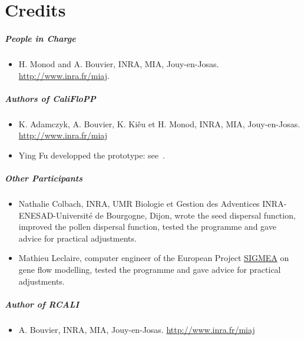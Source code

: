 
\chapter*{Credits}

\paragraph{People in Charge}
\begin{itemize}
\item
H. Monod and A. Bouvier,
INRA, MIA, Jouy-en-Josas.
\href{http://www.inra.fr/miaj}{http://www.inra.fr/miaj}.
\end{itemize}

\paragraph{Authors of CaliFloPP}
\begin{itemize}
\item
K. Adamczyk, A. Bouvier, K. Kiêu et H. Monod,
INRA, MIA, Jouy-en-Josas.
\href{http://www.inra.fr/miaj}{http://www.inra.fr/miaj}

\item
Ying Fu developped the prototype: see~\cite{Ying:2005}.

\end{itemize}

\paragraph{Other Participants}
\begin{itemize}
\item
Nathalie Colbach,
INRA,
UMR Biologie et Gestion des Adventices
INRA-ENESAD-Université de Bourgogne,
Dijon, wrote the seed dispersal function,
improved the pollen dispersal function,
tested the programme
and gave advice for practical adjustments.


\item
Mathieu Leclaire, computer engineer 
of the European Project 
\href{http://sigmea.dyndns.org}{SIGMEA}
on gene flow modelling,
tested the programme
and gave advice for practical adjustments.

\end{itemize}

\paragraph{Author of RCALI}
\begin{itemize}
\item
A. Bouvier,
INRA, MIA, Jouy-en-Josas.
\href{http://www.inra.fr/miaj}{http://www.inra.fr/miaj}
\end{itemize}


